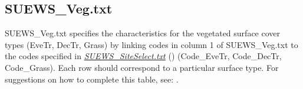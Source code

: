 \documentclass[letterpaper,10pt,english]{sphinxmanual}
\begin{document}
\subsection{SUEWS\_Veg.txt}
\label{\detokenize{input_files/SUEWS_SiteInfo/SUEWS_Veg:suews-veg-txt}}\label{\detokenize{input_files/SUEWS_SiteInfo/SUEWS_Veg::doc}}\label{\detokenize{input_files/SUEWS_SiteInfo/SUEWS_Veg:id1}}
SUEWS\_Veg.txt specifies the characteristics for the vegetated surface
cover types (EveTr, DecTr, Grass) by linking codes in column 1 of
SUEWS\_Veg.txt to the codes specified in
{\hyperref[\detokenize{input_files/SUEWS_SiteInfo/SUEWS_Veg:SUEWS_SiteSelect.txt}]{\emph{SUEWS\_SiteSelect.txt}}} () (Code\_EveTr,
Code\_DecTr, Code\_Grass). Each row should correspond to a particular
surface type. For suggestions on how to complete this table, see:
.
\end{document}
